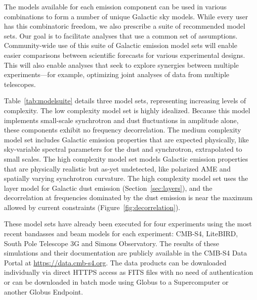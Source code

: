 \documentclass[twocolumn]{aastex631}
\begin{document}
The models available for each emission component can be used in various combinations to form a number of unique Galactic sky models. While every user has this combinatoric freedom, we also prescribe a suite of recommended model sets. Our goal is to facilitate analyses that use a common set of assumptions. Community-wide use of this suite of Galactic emission model sets will enable easier comparisons between scientific forecasts for various experimental designs. This will also enable analyses that seek to explore synergies between multiple experiments---for example, optimizing joint analyses of data from multiple telescopes. 




Table~\ref{tab:modelsuite} details three model sets, representing increasing levels of complexity. The low complexity model set is highly idealized. Because this model implements small-scale synchrotron and dust fluctuations in amplitude alone, these components exhibit no frequency decorrelation. The medium complexity model set includes Galactic emission properties that are expected physically, like sky-variable spectral parameters for the dust and synchrotron, extrapolated to small scales. The high complexity model set models Galactic emission properties that are physically realistic but as-yet undetected, like polarized AME and spatially varying synchrotron curvature. The high complexity model set uses the layer model for Galactic dust emission (Section~\ref{sec:layers}), and the decorrelation at frequencies dominated by the dust emission is near the maximum allowed by current constraints (Figure~\ref{fig:decorrelation}).

These model sets have already been executed for four experiments using the most recent bandasses and beam models for each experiment: CMB-S4, LiteBIRD, South Pole Telescope 3G and Simons Observatory. The results of these simulations and their documentation are publicly available in the CMB-S4 Data Portal at \url{https://data.cmb-s4.org}. The data products can be downloaded individually via direct HTTPS access as FITS files with no need of authentication or can be downloaded in batch mode using Globus to a Supercomputer or another Globus Endpoint.
\end{document}
